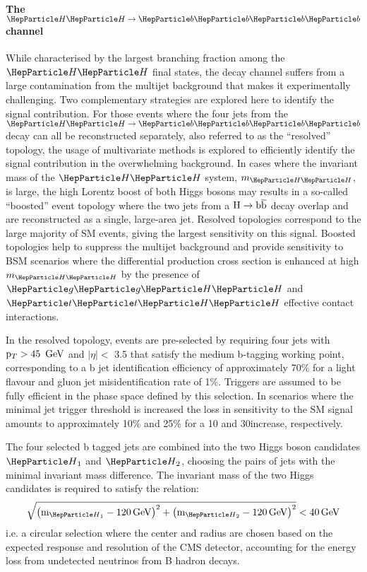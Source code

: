 \paragraph{The $\HH\to\bbbb$ channel}

While characterised by the largest branching fraction among the $\HH$ final states, the \bbbb decay channel suffers from a large contamination from the multijet background that makes it experimentally challenging.
Two complementary strategies are explored here to identify the signal contribution.
For those events where the four jets from the $\HH\to\bbbb$ decay can all be reconstructed separately, also referred to as the ``resolved'' topology, the usage of multivariate methods is explored to efficiently identify the signal contribution in the overwhelming background.
In cases where the invariant mass of the $\HH$ system, $m_{\HH}$, is large, the high Lorentz boost of both Higgs bosons may results in a so-called ``boosted'' event topology where the two jets from a $\text{H}\rightarrow\text{b}\overline{\text{b}}$ decay overlap and are reconstructed as a single, large-area jet.
Resolved topologies correspond to the large majority of SM \HH events, giving the largest sensitivity on this signal.
Boosted topologies help to suppress the multijet background and provide sensitivity to BSM scenarios where the differential \HH production cross section is enhanced at high $m_{\HH}$ by the presence of $\Pg\Pg\HH$ and $\PQt\PQt\HH$ effective contact interactions.

In the resolved topology, events are pre-selected by requiring four jets with $\mathrm{p}_{T} > 45~\,\text{Ge\hspace{-.08em}V}$ and $|\eta| <$ 3.5 that satisfy the medium b-tagging working point, corresponding to a b jet identification efficiency of approximately 70\% for a light  flavour and gluon jet misidentification rate of  1\%.
Triggers are assumed to be fully efficient in the phase space defined by this selection.
In scenarios where the minimal jet trigger \pt threshold is increased the loss in sensitivity to the SM signal amounts to approximately 10\% and 25\% for a 10 and 30\GeV increase, respectively.

The four selected b tagged jets are combined into the two Higgs boson candidates $\PH_1$ and $\PH_2$, choosing the pairs of jets with the minimal invariant mass difference.
The invariant mass of the two Higgs candidates is required to satisfy the relation:
\begin{equation}
\sqrt{ \left( \text{m}_{\PH_1} - 120\GeV\right)^2 + \left( \text{m}_{\PH_2} - 120\GeV\right)^2 } < 40\GeV
\end{equation}
i.e. a circular selection where the center and radius are chosen based on the expected response and resolution of the CMS detector, accounting for the energy loss from undetected neutrinos from B hadron decays.

